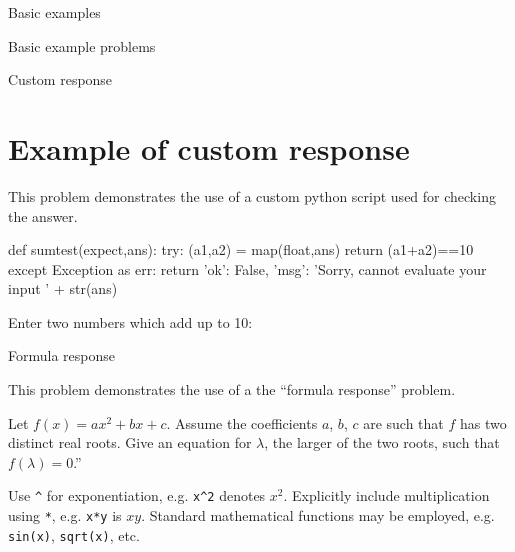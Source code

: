 \begin{edXchapter}{Basic examples}
\begin{edXsection}{Basic example problems}
\begin{edXvertical}
\begin{edXproblem}{Custom response}

\section{Example of custom response}  

This problem demonstrates the use of a custom python script used for
checking the answer.

\begin{edXscript}

def sumtest(expect,ans):
    try:
        (a1,a2) = map(float,ans)
        return (a1+a2)==10
    except Exception as err:
        return {'ok': False, 'msg': 'Sorry, cannot evaluate your input ' + str(ans)}

\end{edXscript}

Enter two numbers which add up to 10:

%

\end{edXproblem}

\end{edXvertical}


\begin{edXvertical}


\begin{edXproblem}{Formula response}

This problem demonstrates the use of a the ``formula response'' problem.

Let $f(x) = a x^2 + bx + c$.  Assume the coefficients $a$, $b$, $c$
are such that $f$ has two distinct real roots. Give an equation for
$\lambda$, the larger of the two roots, such that $f(\lambda)=0$.''

Use \texttt{^} for exponentiation, e.g. \texttt{x^2} denotes $x^2$.
Explicitly include multiplication using \texttt{*}, e.g. \texttt{x*y} is
$xy$.  Standard mathematical functions may be employed, e.g. \texttt{sin(x)},
\texttt{sqrt(x)}, etc.



\end{edXproblem}
\end{edXvertical}
\end{edXsection}
\end{edXchapter}
